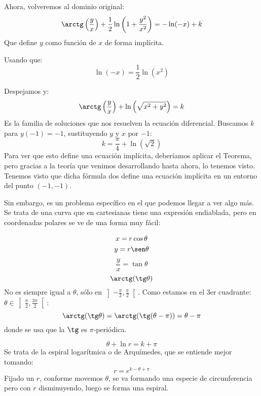 \begin{ejemplo}
 Ahora, volveremos al dominio original:
 \begin{equation*}
     \arctg\left(\dfrac{y}{x}\right) + \dfrac{1}{2}\ln\left(1+\dfrac{y^2}{x^2}\right) = -\ln(-x) + k
 \end{equation*}
 Que define $y$ como función de $x$ de forma implícita.

 Usando que:
 \begin{equation*}
     \ln(-x) = \dfrac{1}{2}\ln(x^2)
 \end{equation*}

 Despejamos y:
 \begin{equation*}
     \arctg\left(\dfrac{y}{x}\right) + \ln\left(\sqrt{x^2+y^2}\right) = k
 \end{equation*}
Es la familia de soluciones que nos resuelven la ecuación diferencial. Buscamos $k$ para $y(-1)=-1$, sustituyendo $y$ y $x$ por $-1$:
\begin{equation*}
    k = \dfrac{\pi}{4} + \ln\left(\sqrt{2}\right)
\end{equation*}
Para ver que esto define una ecuación implícita, deberíamos aplicar el Teorema, pero gracias a la teoría que venimos desarrollando hasta ahora, lo tenemos visto.
Tenemos visto que dicha fórmula dos define una ecuación implícita en un entorno del punto $(-1,-1)$.

Sin embargo, es un problema específico en el que podemos llegar a ver algo más.
Se trata de una curva que en cartesianas tiene una expresión endiablada, pero en coordenadas polares se ve de una forma muy fácil:

\begin{gather*}
    x = r\cos \theta \\
    y = r\sen \theta
\end{gather*}
\begin{equation*}
    \dfrac{y}{x} = \tan \theta
\end{equation*}
\begin{equation*}
    \arctg(\tg \theta)
\end{equation*}
No es siempre igual a $\theta$, sólo en $\left]-\frac{\pi}{2}, \frac{\pi}{2}\right[$.
Como estamos en el 3er cuadrante: $\theta \in \left]\frac{\pi}{2}, \frac{3\pi}{2}\right[$:
\begin{equation*}
    \arctg(\tg \theta) = \arctg(\tg(\theta - \pi)) = \theta - \pi
\end{equation*}
donde se usa que la $\tg$ es $\pi$-periódica.

\begin{equation*}
    \theta + \ln r = k + \pi
\end{equation*}
Se trata de la espiral logarítmica o de Arquímedes, que se entiende mejor tomando:
\begin{equation*}
    r = e^{k-\theta+\pi}
\end{equation*}
Fijado un $r$, conforme movemos $\theta$, se va formando una especie de circunferencia pero con $r$ disminuyendo, luego se forma una espiral.


\end{ejemplo}
